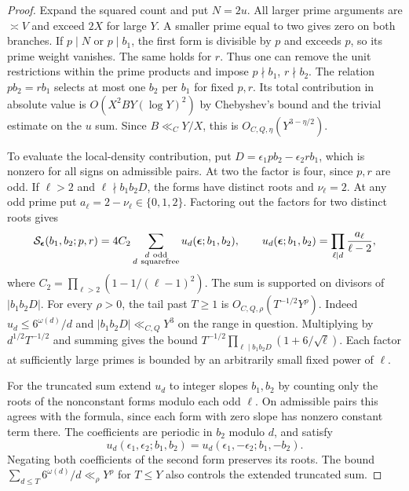 \documentclass[11pt,a4paper]{article}
\numberwithin{equation}{section}
\begin{document}
\begin{proof}
Expand the squared count and put $N=2u$.
All larger prime arguments are $\asymp V$ and exceed
$2X$ for large $Y$. A smaller prime equal to two
gives zero on both branches. If $p\mid N$ or $p\mid b_1$,
the first form is divisible by $p$ and exceeds $p$,
so its prime weight vanishes. The same holds for $r$.
Thus one can remove the unit restrictions within the
prime products and impose $p\nmid b_1$, $r\nmid b_2$.
The relation $p b_2=r b_1$ selects at most one $b_2$
per $b_1$ for fixed $p,r$. Its total contribution in
absolute value is $O(X^2 B Y(\log Y)^2)$ by Chebyshev's
bound and the trivial estimate on the $u$ sum. Since
$B\ll_C Y/X$, this is $O_{C,Q,\eta}(Y^{3-\eta/2})$.

To evaluate the local-density contribution, put
$D=\epsilon_1p b_2-\epsilon_2r b_1$, which is nonzero
for all signs on admissible pairs. At two the factor
is four, since $p,r$ are odd. If $\ell>2$ and
$\ell\nmid b_1b_2 D$, the forms have distinct roots
and $\nu_\ell=2$. At any odd prime put
$a_\ell=2-\nu_\ell\in\{0,1,2\}$. Factoring out the
factors for two distinct roots gives
\[
 \mathcal S_{\boldsymbol\epsilon}(b_1,b_2;p,r)
     =4C_2\sum_{\substack{d\ {\rm odd}\\d\ {\rm squarefree}}}
            u_d(\boldsymbol\epsilon;b_1,b_2),
 \qquad
 u_d(\boldsymbol\epsilon;b_1,b_2)=
                \prod_{\ell\mid d}\frac{a_\ell}{\ell-2},
\]
where $C_2=\prod_{\ell>2}(1-1/(\ell-1)^2)$.
The sum is supported on divisors of $|b_1b_2 D|$.
For every $\rho>0$, the tail past $T\ge1$ is
$O_{C,Q,\rho}(T^{-1/2}Y^\rho)$. Indeed
$u_d\le 6^{\omega(d)}/d$ and $|b_1b_2 D|\ll_{C,Q}Y^3$
on the range in question. Multiplying by $d^{1/2}T^{-1/2}$
and summing gives the bound
$T^{-1/2}\prod_{\ell\mid b_1b_2 D}(1+6/\sqrt\ell)$.
Each factor at sufficiently large primes is bounded by
an arbitrarily small fixed power of $\ell$.

For the truncated sum extend $u_d$ to integer slopes
$b_1,b_2$ by counting only the roots of the nonconstant
forms modulo each odd $\ell$. On admissible pairs this
agrees with the formula, since each form with zero
slope has nonzero constant term there. The coefficients
are periodic in $b_2$ modulo $d$, and satisfy
\begin{equation}
 u_d(\epsilon_1,\epsilon_2;b_1,b_2)
      =u_d(\epsilon_1,-\epsilon_2;b_1,-b_2).
 \label{eq:criticalgridvarianceflip}
\end{equation}
Negating both coefficients of the second form preserves
its roots. The bound
$\sum_{d\le T}6^{\omega(d)}/d\ll_\rho Y^\rho$
for $T\le Y$ also controls the extended truncated sum.


\end{proof}
\end{document}
